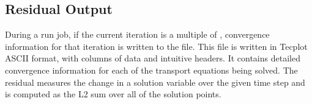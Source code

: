 \subsection{Residual Output}
\label{SEC:Files:Residual_Output}


During a run job, if the current iteration is a multiple of
,
convergence information for that iteration is written to the
 file.
%
This file is written in Tecplot ASCII format, with columns of
data and intuitive headers.
%
It contains detailed convergence information for each of the
transport equations being solved.
%
The residual measures the change in a solution variable over
the given time step and is computed as the L2 sum over all
of the solution points.




